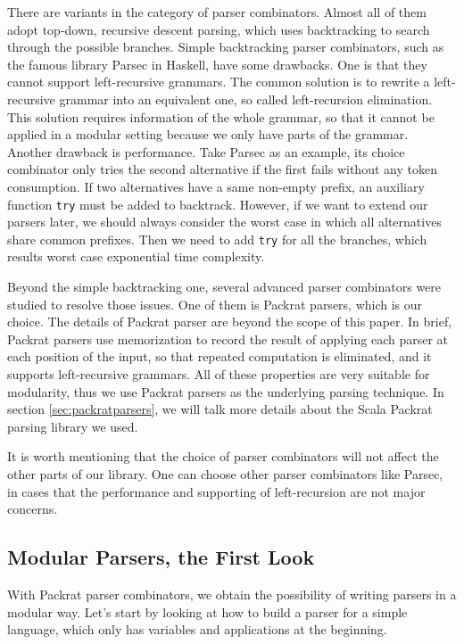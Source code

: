 There are variants in the category of parser combinators. Almost all of them adopt top-down, recursive descent parsing, which uses backtracking to search through the possible branches. Simple backtracking parser combinators, such as the famous library Parsec in Haskell, have some drawbacks. One is that they cannot support left-recursive grammars. The common solution is to rewrite a left-recursive grammar into an equivalent one, so called left-recursion elimination. This solution requires information of the whole grammar, so that it cannot be applied in a modular setting because we only have parts of the grammar. Another drawback is performance. Take Parsec as an example, its choice combinator only tries the second alternative if the first fails without any token consumption. If two alternatives have a same non-empty prefix, an auxiliary function \lstinline{try} must be added to backtrack. However, if we want to extend our parsers later, we should always consider the worst case in which all alternatives share common prefixes. Then we need to add \lstinline{try} for all the branches, which results worst case exponential time complexity.

Beyond the simple backtracking one, several advanced parser combinators were studied to resolve those issues. One of them is Packrat parsers, which is our choice. The details of Packrat parser are beyond the scope of this paper. In brief, Packrat parsers use memorization to record the result of applying each parser at each position of the input, so that repeated computation is eliminated, and it supports left-recursive grammars. All of these properties are very suitable for modularity, thus we use Packrat parsers as the underlying parsing technique. In section \ref{sec:packratparsers}, we will talk more details about the Scala Packrat parsing library we used.

It is worth mentioning that the choice of parser combinators will not affect the other parts of our library. One can choose other parser combinators like Parsec, in cases that the performance and supporting of left-recursion are not major concerns.

\subsection{Modular Parsers, the First Look}\label{subsec:overview-firstlook}

With Packrat parser combinators, we obtain the possibility of writing parsers in a modular way. Let's start by looking at how to build a parser for a simple language, which only has variables and applications at the beginning.

